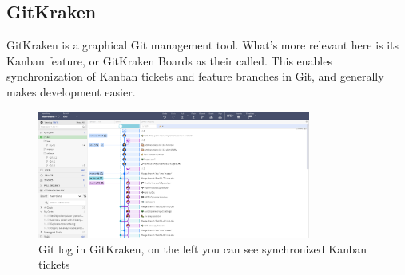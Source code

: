 \subsection*{GitKraken}\label{chap:gitkraken}
GitKraken is a graphical Git management tool. What's more relevant here is its Kanban feature, or GitKraken Boards as their called. This enables synchronization of Kanban tickets and feature branches in Git, and generally makes development easier.
\begin{figure}[ht]
    \centering
    \includegraphics[width=0.8\textwidth]{fig/gitkraken}
    \caption{Git log in GitKraken, on the left you can see synchronized Kanban tickets}
\end{figure}






